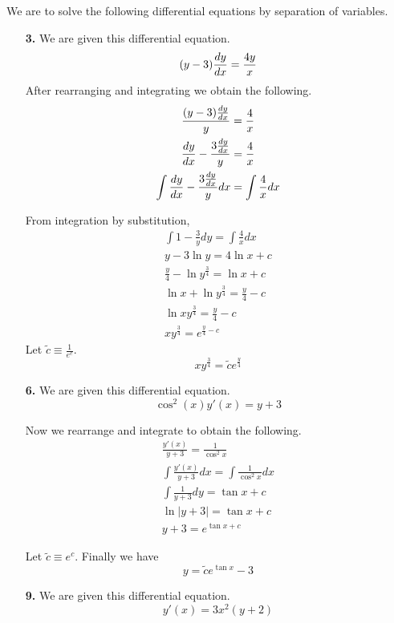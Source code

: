 
We are to solve the following differential equations by separation of variables.
\begin{enumerate}
	\item[\textbf{3.}]
		We are given this differential equation.
		\[(y-3)\frac{dy}{dx} = \frac{4y}{x}\]
		After rearranging and integrating we obtain the following.
		\begin{gather*}
			\frac{(y-3)\frac{dy}{dx}}{y} = \frac{4}{x}\\
			\frac{dy}{dx} - \frac{3\frac{dy}{dx}}{y} = \frac{4}{x}\\
			\int \frac{dy}{dx} - \frac{3\frac{dy}{dx}}{y} dx = \int \frac{4}{x} dx\\
		\end{gather*}

		From integration by substitution,
		\begin{gather*}
			\int 1 - \frac{3}{y} dy = \int \frac{4}{x} dx\\
			y - 3 \ln y = 4 \ln x + c\\
			\frac{y}{4} - \ln y^{\frac{3}{4}} = \ln x + c\\
			\ln x + \ln y^{\frac{3}{4}} = \frac{y}{4} - c\\
			\ln xy^{\frac{3}{4}} = \frac{y}{4} - c\\
			xy^{\frac{3}{4}}  = e^{\frac{y}{4} - c}
		\end{gather*}
		Let \(\tilde{c} \equiv \frac{1}{e^c}\).
		\[xy^{\frac{3}{4}} = \tilde{c} e^{\frac{y}{4}}\]

	\item[\textbf{6.}]
		We are given this differential equation.
		\[\cos^2 (x) y'(x) = y + 3\]

		Now we rearrange and integrate to obtain the following.
		\begin{gather*}
			\frac{y'(x)}{y+3} = \frac{1}{\cos^2 x}\\
			\int \frac{y'(x)}{y+3} dx = \int \frac{1}{\cos^2 x} dx\\
			\int \frac{1}{y+3} dy = \tan x + c\\
			\ln \vert y+3 \vert = \tan x + c\\
			y + 3 = e^{\tan x + c}
		\end{gather*}

		Let \(\tilde{c} \equiv e^c\). Finally we have
		\[y = \tilde{c} e^{\tan x} - 3\]

	\item[\textbf{9.}]
		We are given this differential equation.
		\[y'(x) = 3x^2 (y+2)\]


\end{enumerate}
